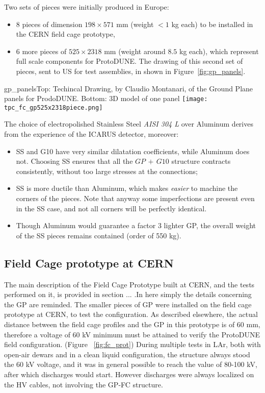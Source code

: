 Two sets of pieces were initially produced in Europe:
\begin{itemize}
\item 8 pieces of dimension $198 \times 571$ mm (weight $< 1$ kg each) to be installed in the CERN field cage prototype,
\item 6 more pieces of  $525 \times 2318$ mm (weight around $8.5$ kg each), which represent full scale components for ProtoDUNE. The drawing of this second set of pieces, sent to US for test assemblies, in shown in Figure~\ref{fig:gp_panels}.
\end{itemize}

\begin{cdrfigure}[ProtoDUNE GP]{gp_panels}{Top: Techincal Drawing, by Claudio Montanari, of the Ground Plane panels for ProdoDUNE. Bottom: 3D model of one panel}
\texttt{[image: tpc\_fc\_gp525x2318piece.png]}
\end{cdrfigure}


The choice of electropolished Stainless Steel \textit{AISI 304 L} over Aluminum derives from the experience of the ICARUS detector, moreover:
\begin{itemize}
\item SS and G10 have very similar dilatation coefficients, while Aluminum does not. Choosing SS ensures that all the $GP\,+\,G10$ structure contracts consistently, without too large stresses at the connections; 
\item SS is more ductile than Aluminum, which makes \textit{easier} to machine the corners of the pieces. Note that anyway some imperfections are present even in the SS case, and not all corners will be perfectly identical. 
\item Though Aluminum would guarantee a factor 3 lighter GP, the overall weight of the SS pieces remains contained (order of 550 kg).
\end{itemize}

\subsection{Field Cage prototype at CERN}
The main description of the Field Cage Prototype built at CERN, and the tests performed on it, is provided in section ... .In here simply the details concerning the GP are reminded. The smaller pieces of GP were installed on the field cage prototype at CERN, to test the configuration. As described elsewhere, the actual distance between the field cage profiles and the GP in this prototype is of 60 mm, therefore a voltage of 60 kV minimum must be attained to verify the ProtoDUNE field configuration. (Figure ~\ref{fig:fc_prot}) During multiple tests in LAr, both with open-air dewars and in a clean liquid configuration, the structure always stood the 60 kV voltage, and it was in general possible to reach the value of 80-100 kV, after which discharges would start. However discharges were always localized on the HV cables, not involving the GP-FC structure.

